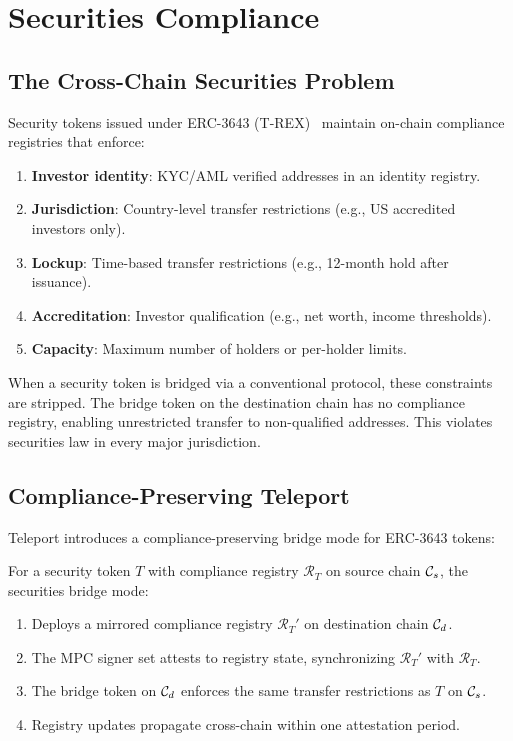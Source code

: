 \section{Securities Compliance}

\label{sec:securities}

\subsection{The Cross-Chain Securities Problem}

Security tokens issued under ERC-3643 (T-REX)~\cite{erc3643} maintain on-chain compliance registries that enforce:

\begin{enumerate}[nosep]
  \item \textbf{Investor identity}: KYC/AML verified addresses in an identity registry.
  \item \textbf{Jurisdiction}: Country-level transfer restrictions (e.g., US accredited investors only).
  \item \textbf{Lockup}: Time-based transfer restrictions (e.g., 12-month hold after issuance).
  \item \textbf{Accreditation}: Investor qualification (e.g., net worth, income thresholds).
  \item \textbf{Capacity}: Maximum number of holders or per-holder limits.
\end{enumerate}

When a security token is bridged via a conventional protocol, these constraints are stripped. The bridge token on the destination chain has no compliance registry, enabling unrestricted transfer to non-qualified addresses. This violates securities law in every major jurisdiction.

\subsection{Compliance-Preserving Teleport}

Teleport introduces a compliance-preserving bridge mode for ERC-3643 tokens:

\begin{definition}
\label{def:securities}
For a security token $T$ with compliance registry $\mathcal{R}_T$ on source chain $\mathcal{C}_s$, the securities bridge mode:
\begin{enumerate}[nosep]
  \item Deploys a mirrored compliance registry $\mathcal{R}_T'$ on destination chain $\mathcal{C}_d$.
  \item The MPC signer set attests to registry state, synchronizing $\mathcal{R}_T'$ with $\mathcal{R}_T$.
  \item The bridge token on $\mathcal{C}_d$ enforces the same transfer restrictions as $T$ on $\mathcal{C}_s$.
  \item Registry updates propagate cross-chain within one attestation period.
\end{enumerate}
\end{definition}

